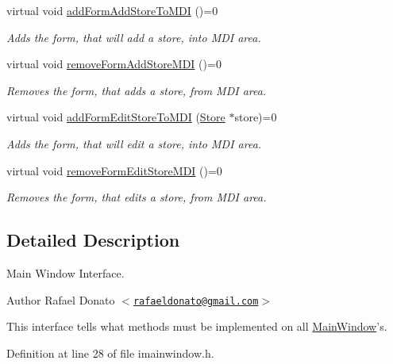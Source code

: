 \begin{DoxyCompactItemize}
virtual void \hyperlink{class_i_main_window_a5720a2cacab89cb3d29ec7a15bd42386}{add\-Form\-Add\-Store\-To\-M\-D\-I} ()=0
\begin{DoxyCompactList}\small\item\em \-Adds the form, that will add a store, into \-M\-D\-I area. \end{DoxyCompactList}\item 
virtual void \hyperlink{class_i_main_window_aa12aea4d8faf4e394fdb2409895a031f}{remove\-Form\-Add\-Store\-M\-D\-I} ()=0
\begin{DoxyCompactList}\small\item\em \-Removes the form, that adds a store, from \-M\-D\-I area. \end{DoxyCompactList}\item 
virtual void \hyperlink{class_i_main_window_aa497e0aebc4d7284f96b02c04ba91b00}{add\-Form\-Edit\-Store\-To\-M\-D\-I} (\hyperlink{class_store}{\-Store} $\ast$store)=0
\begin{DoxyCompactList}\small\item\em \-Adds the form, that will edit a store, into \-M\-D\-I area. \end{DoxyCompactList}\item 
virtual void \hyperlink{class_i_main_window_a2a8a096f0ad79a8591b36df424876676}{remove\-Form\-Edit\-Store\-M\-D\-I} ()=0
\begin{DoxyCompactList}\small\item\em \-Removes the form, that edits a store, from \-M\-D\-I area. \end{DoxyCompactList}\end{DoxyCompactItemize}


\subsection{\-Detailed \-Description}
\-Main \-Window \-Interface. 

\begin{DoxyAuthor}{\-Author}
\-Rafael \-Donato $<$\href{mailto:rafaeldonato@gmail.com}{\tt rafaeldonato@gmail.\-com}$>$
\end{DoxyAuthor}
\-This interface tells what methods must be implemented on all \hyperlink{class_main_window}{\-Main\-Window}'s. 

\-Definition at line 28 of file imainwindow.\-h.



